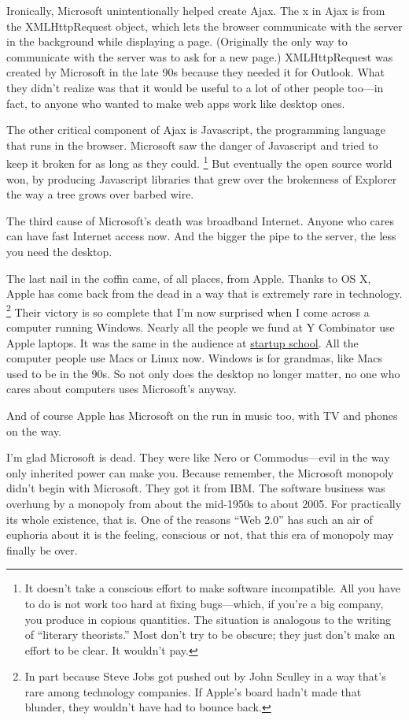 \documentclass[12pt]{book}
\begin{document}
Ironically, Microsoft unintentionally helped create Ajax. The x in Ajax
is from the XMLHttpRequest object, which lets the browser communicate
with the server in the background while displaying a page. (Originally
the only way to communicate with the server was to ask for a new page.)
XMLHttpRequest was created by Microsoft in the late 90s because they
needed it for Outlook. What they didn't realize was that it would be
useful to a lot of other people too---in fact, to anyone who wanted to
make web apps work like desktop ones.

The other critical component of Ajax is Javascript, the programming
language that runs in the browser. Microsoft saw the danger of
Javascript and tried to keep it broken for as long as they could.
\footnote{It doesn't take a conscious effort to make software
incompatible. All you have to do is not work too hard at fixing
bugs---which, if you're a big company, you produce in copious
quantities. The situation is analogous to the writing of ``literary
theorists.'' Most don't try to be obscure; they just don't make an
effort to be clear. It wouldn't pay.} But eventually the open source world won, by
producing Javascript libraries that grew over the brokenness of Explorer
the way a tree grows over barbed wire.

The third cause of Microsoft's death was broadband Internet. Anyone who
cares can have fast Internet access now. And the bigger the pipe to the
server, the less you need the desktop.

The last nail in the coffin came, of all places, from Apple. Thanks to
OS X, Apple has come back from the dead in a way that is extremely rare
in technology. \footnote{In part because Steve Jobs got pushed out by John Sculley in a
way that's rare among technology companies. If Apple's board hadn't made
that blunder, they wouldn't have had to bounce back.} Their victory is so complete that
I'm now surprised when I come across a computer running Windows. Nearly
all the people we fund at Y Combinator use Apple laptops. It was the
same in the audience at
\href{http://www.bosstalks.com/StartupSchool2007/all_macs_and_all_writing.jpg}{startup
school}. All the computer people use Macs or Linux now. Windows is for
grandmas, like Macs used to be in the 90s. So not only does the desktop
no longer matter, no one who cares about computers uses Microsoft's
anyway.

And of course Apple has Microsoft on the run in music too, with TV and
phones on the way.

I'm glad Microsoft is dead. They were like Nero or Commodus---evil in
the way only inherited power can make you. Because remember, the
Microsoft monopoly didn't begin with Microsoft. They got it from IBM.
The software business was overhung by a monopoly from about the
mid-1950s to about 2005. For practically its whole existence, that is.
One of the reasons ``Web 2.0'' has such an air of euphoria about it is
the feeling, conscious or not, that this era of monopoly may finally be
over.
\end{document}
